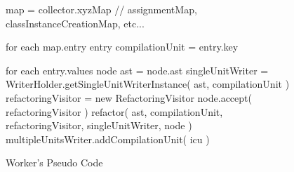 \begin{figure}[H]
\begin{sourcecode}
\begin{javacode}{}
map = collector.xyzMap // assignmentMap, classInstanceCreationMap, etc...

for each map.entry entry
	compilationUnit = entry.key
	
	for each entry.values node
		ast = node.ast
		singleUnitWriter = WriterHolder.getSingleUnitWriterInstance( ast, compilationUnit )
		refactoringVisitor = new RefactoringVisitor
		node.accept( refactoringVisitor )		
		refactor( ast, compilationUnit, refactoringVisitor, singleUnitWriter, node )
		multipleUnitsWriter.addCompilationUnit( icu )
	
\end{javacode}
\caption{Worker's Pseudo Code}
\label{code:workers-pseudo-code}
\end{sourcecode}
\end{figure}